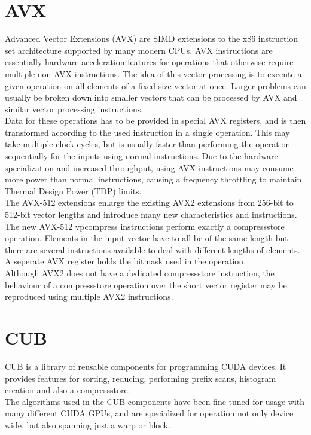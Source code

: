 \documentclass{tudscrreprt}
\begin{document}
		\section{AVX}
			Advanced Vector Extensions (AVX) are SIMD extensions to the x86 instruction set architecture supported by many modern CPUs. AVX instructions are essentially hardware acceleration features for operations that otherwise require multiple non-AVX instructions. The idea of this vector processing is to execute a given operation on all elements of a fixed size vector at once. Larger problems can usually be broken down into smaller vectors that can be processed by AVX and similar vector processing instructions. \cite{avx} \\
			Data for these operations has to be provided in special AVX registers, and is then transformed according to the used instruction in a single operation. This may take multiple clock cycles, but is usually faster than performing the operation sequentially for the inputs using normal instructions. Due to the hardware specialization and increased throughput, using AVX instructions may consume more power than normal instructions, causing a frequency throttling to maintain Thermal Design Power (TDP) limits. \cite{avx_whitepaper} \\
			
			The AVX-512 extensions enlarge the existing AVX2 extensions from 256-bit to 512-bit vector lengths and introduce many new characteristics and instructions. The new AVX-512 vpcompress instructions perform exactly a compressstore operation. Elements in the input vector have to all be of the same length but there are several instructions available to deal with different lengths of elements. A seperate AVX register holds the bitmask used in the operation. \\
			
			Although AVX2 does not have a dedicated compressstore instruction, the behaviour of a compressstore operation over the short vector register may be reproduced using multiple AVX2 instructions. \cite{avx2_leftpack, cern_datastreaming} \\
		
		\section{CUB}
			CUB is a library of reusable components for programming CUDA devices. It provides features for sorting, reducing, performing prefix scans, histogram creation and also a compressstore. \cite{cub} \\
			The algorithms used in the CUB components have been fine tuned for usage with many different CUDA GPUs, and are specialized for operation not only device wide, but also spanning just a warp or block. \\
			
\end{document}
